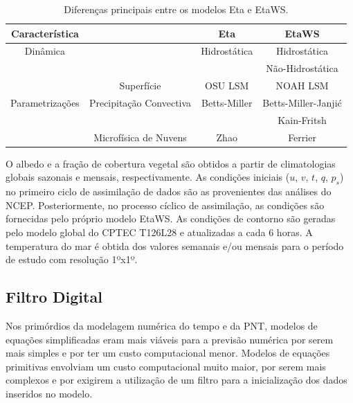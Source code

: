 \begin{table}[ht]
\caption{Diferenças principais entre os modelos Eta e EtaWS.}
\label{tab01}
\centering
\begin{tabular}{c|c|c|c}
\hline
Característica      &                                 & Eta               & EtaWS                    \\
\hline
Dinâmica            &                                 & Hidrostática  & Hidrostática         \\
                        &                                 &                   & Não-Hidrostática \\
                        & Superfície                  & OSU LSM           & NOAH LSM                 \\
Parametrizações & Precipitação Convectiva & Betts-Miller      & Betts-Miller-Janji\'{c}  \\
                        &                                 &                   & Kain-Fritsh              \\
                        & Microfísica de Nuvens       & Zhao              & Ferrier                  \\
\hline
\end{tabular}
\end{table}

O albedo e a fração de cobertura vegetal são obtidos a partir de climatologias globais sazonais e mensais, respectivamente. As condições iniciais ($u$, $v$, $t$, $q$, $p_{s}$) no primeiro ciclo de assimilação de dados são as provenientes das análises do NCEP. Posteriormente, no processo cíclico de assimilação, as condições são fornecidas pelo próprio modelo EtaWS. As condições de contorno são geradas pelo modelo global do CPTEC T126L28 e atualizadas a cada 6 horas. A temperatura do mar é obtida dos valores semanais e/ou mensais para o período de estudo com resolução 1ºx1º.

\subsection{Filtro Digital}

Nos primórdios da modelagem numérica do tempo e da PNT, modelos de equações simplificadas eram mais viáveis para a previsão numérica por serem mais simples e por ter um custo computacional menor. Modelos de equações primitivas envolviam um custo computacional muito maior, por serem mais complexos e por exigirem a utilização de um filtro para a inicialização dos dados inseridos no modelo. 

